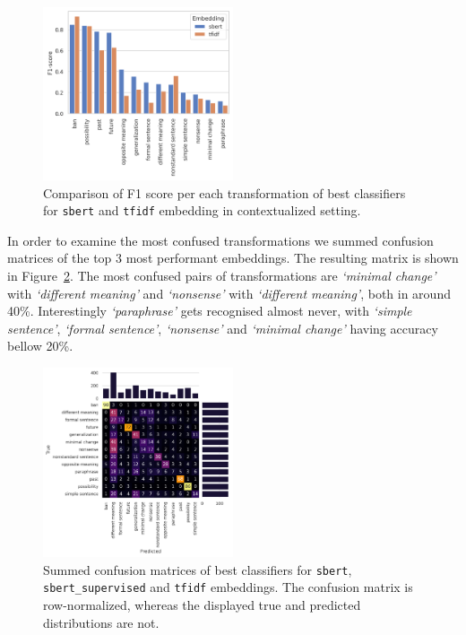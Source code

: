 \documentclass[11pt]{article}
\newcommand{\Embed}[1]{\texttt{#1}}
\newcommand{\Trans}[1]{\textsl{`#1'}}
\begin{document}
\begin{figure}[htp]
  \centering
  \includegraphics[width=0.5\textwidth]{./figs/cls_gs_diff_labels.png}

  \caption{Comparison of F1 score per each transformation of best classifiers
  for \Embed{sbert} and \Embed{tfidf} embedding in contextualized
  setting.}\label{fig:cls_gs_diff_labels}
\end{figure}

In order to examine the most confused transformations we summed confusion
matrices of the top 3 most performant embeddings. The resulting matrix is shown
in Figure~\ref{fig:cls_gs_diff_conf_mat}. The most confused pairs of
transformations are \Trans{minimal change} with \Trans{different meaning} and
\Trans{nonsense} with \Trans{different meaning}, both in around 40\%.
Interestingly \Trans{paraphrase} gets recognised almost never, with
\Trans{simple sentence}, \Trans{formal sentence}, \Trans{nonsense} and
\Trans{minimal change} having accuracy bellow 20\%.

\begin{figure}[htp]
  \centering
  \includegraphics[width=0.5\textwidth]{./figs/cls_gs_diff_conf_mat.png}
  \caption{Summed confusion matrices of best classifiers for \Embed{sbert},
  \Embed{sbert\_supervised} and \Embed{tfidf} embeddings. The confusion matrix
  is row-normalized, whereas the displayed true and predicted distributions are
  not.}\label{fig:cls_gs_diff_conf_mat}
\end{figure}
\end{document}
